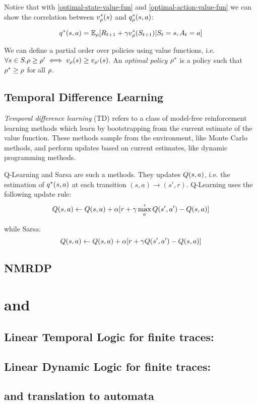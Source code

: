 	Notice that with \ref{optimal-state-value-fun} and \ref{optimal-action-value-fun} we can show the correlation between $v^*_\rho(s)$ and $q^*_\rho(s, a)$:
	
	\begin{equation}
		q^*(s, a) = \mathbb{E}_\rho[R_{t+1} + \gamma v^*_\rho(S_{t+1})| S_t = s, A_t = a]
	\end{equation}
	
	
	We can define a partial order over policies using value functions, i.e. $\forall s\in S. \rho \ge \rho' \iff v_\rho(s) \ge v_{\rho'}(s)$. An \emph{optimal policy} $\rho^*$ is a policy such that $\rho^* \ge \rho$ for all $\rho$. 
	
	
\subsection{Temporal Difference Learning}

\emph{Temporal difference learning} (TD) refers to a class of model-free reinforcement learning methods which learn by bootstrapping from the current estimate of the value function. These methods sample from the environment, like Monte Carlo methods, and perform updates based on current estimates, like dynamic programming methods.

Q-Learning and Sarsa are such a methods. They updates $Q(s, a)$, i.e. the estimation of $q^*(s, a)$ at each transition $(s, a) \to (s', r)$. Q-Learning uses the following update rule:
\begin{equation}
Q(s, a) \leftarrow Q(s, a) + \alpha [r + \gamma \max_a' Q(s', a') - Q(s, a)]
\end{equation}

while Sarsa:
\begin{equation}
Q(s, a) \leftarrow Q(s, a) + \alpha [r + \gamma Q(s', a') - Q(s, a)]
\end{equation}

\subsection{NMRDP}
\label{NMRDP}
\section{\LTLf and \LDLf}
\subsection{Linear Temporal Logic for finite traces: \LTLf}
\subsection{Linear Dynamic Logic for finite traces: \LDLf}
\subsection{\LTLf and \LDLf translation to automata}
